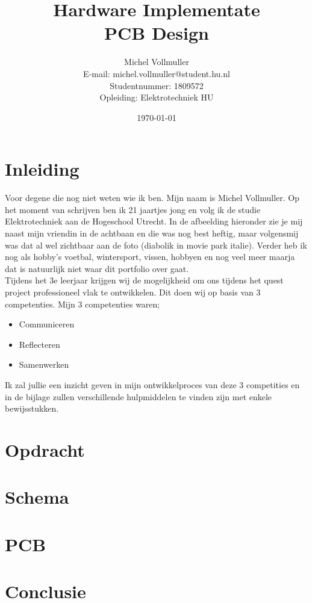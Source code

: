 \documentclass[openany]{book}
\begin{document}
\title{%
  Hardware Implementate \\
  \large PCB Design}
\author{Michel Vollmuller \\
        E-mail: michel.vollmuller@student.hu.nl \\
        Studentnummer: 1809572 \\
        Opleiding: Elektrotechniek HU}
\date{\today}

\maketitle

\chapter*{Inleiding}
Voor degene die nog niet weten wie ik ben. Mijn naam is Michel Vollmuller. Op het moment van schrijven ben ik 21 jaartjes jong en volg ik de studie Elektrotechniek aan de Hogeschool Utrecht. In de afbeelding hieronder zie je mij naast mijn vriendin in de achtbaan en die was nog best heftig, maar volgensmij was dat al wel zichtbaar aan de foto (diabolik in movie park italie). Verder heb ik nog als hobby's voetbal, wintersport, vissen, hobbyen en nog veel meer maarja dat is natuurlijk niet waar dit portfolio over gaat.\\
Tijdens het 3e leerjaar krijgen wij de mogelijkheid om ons tijdens het quest project professioneel vlak te ontwikkelen. Dit doen wij op basis van 3 competenties. Mijn 3 competenties waren;
\begin{itemize}
    \item Communiceren
    \item Reflecteren
    \item Samenwerken
\end{itemize}
Ik zal jullie een inzicht geven in mijn ontwikkelproces van deze 3 competities en in de bijlage zullen verschillende hulpmiddelen te vinden zijn met enkele bewijsstukken.


\tableofcontents

\chapter{Opdracht}
    

\chapter{Schema}
    

\chapter{PCB}
     

\chapter{Conclusie}
     

\appendix
\end{document}
